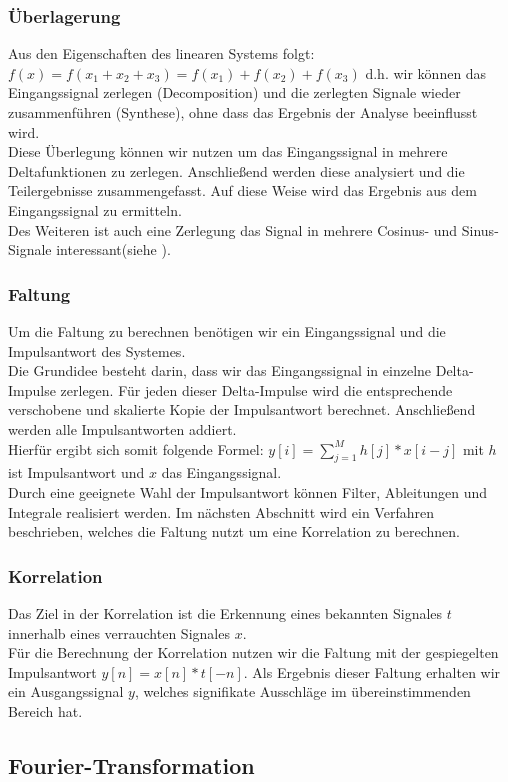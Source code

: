 \documentclass{article} %
\begin{document}
		\subsubsection{Überlagerung}

		Aus den Eigenschaften des linearen Systems folgt: $f(x) = f(x_1+x_2+x_3) = f(x_1)+f(x_2)+f(x_3)$ d.h. wir können das Eingangssignal zerlegen (Decomposition) und die zerlegten Signale wieder zusammenführen (Synthese), ohne dass das Ergebnis der Analyse beeinflusst wird.\\
		Diese Überlegung können wir nutzen um das Eingangssignal in mehrere Deltafunktionen zu zerlegen. Anschließend werden diese analysiert und die Teilergebnisse zusammengefasst. Auf diese Weise wird das Ergebnis aus dem Eingangssignal zu ermitteln.\\
		Des Weiteren ist auch eine Zerlegung das Signal in mehrere Cosinus- und Sinus-Signale interessant(siehe \label{sec-Fourier}).
		\subsubsection{Faltung}
		Um die Faltung zu berechnen benötigen wir ein Eingangssignal und die Impulsantwort des Systemes.\\
		Die Grundidee besteht darin, dass wir das Eingangssignal in einzelne Delta-Impulse zerlegen. Für jeden dieser Delta-Impulse wird die entsprechende verschobene und skalierte Kopie der Impulsantwort berechnet. Anschließend werden alle Impulsantworten addiert.\\
		Hierfür ergibt sich somit folgende Formel: $y[i] = \sum_{j=1}^{M}h[j]*x[i-j]$ mit $h$ ist Impulsantwort und $x$ das Eingangssignal.\\
		Durch eine geeignete Wahl der Impulsantwort können Filter, Ableitungen und Integrale realisiert werden. Im nächsten Abschnitt wird ein Verfahren beschrieben, welches die Faltung nutzt um eine Korrelation zu berechnen.
		\subsubsection{Korrelation}
		Das Ziel in der Korrelation ist die Erkennung eines bekannten Signales $t$ innerhalb eines verrauchten Signales $x$.\\
		Für die Berechnung der Korrelation nutzen wir die Faltung mit der gespiegelten Impulsantwort $y[n] =x[n]*t[-n]$. Als Ergebnis dieser Faltung erhalten wir ein Ausgangssignal $y$, welches signifikate Ausschläge im übereinstimmenden Bereich hat.
		\subsection{Fourier-Transformation}
\end{document}
